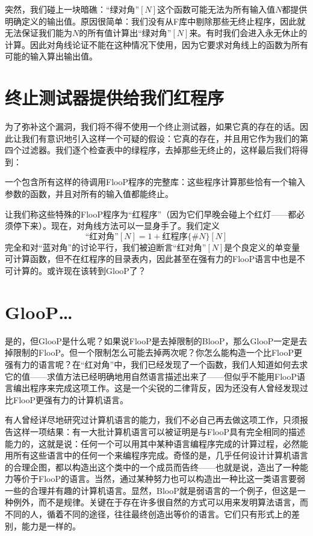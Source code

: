 突然，我们碰上一块暗礁：“绿对角”$[N]$这个函数可能无法为所有输入值$N$都提供明确定义的输出值。原因很简单：我们没有从F库中剔除那些无终止程序，因此就无法保证我们能为$N$的所有值计算出“绿对角”$[N]$来。有时我们会进入永无休止的计算。因此对角线论证不能在这种情况下使用，因为它要求对角线上的函数为所有可能的输入算出输出值。

\section{终止测试器提供给我们红程序}

为了弥补这个漏洞，我们将不得不使用一个终止测试器，如果它真的存在的话。因此让我们有意识地引入这样一个可疑的假设：它真的存在，并且用它作为我们的第四个过滤器。我们逐个检查表中的绿程序，去掉那些无终止的，这样最后我们将得到：

\begin{block}
一个包含所有这样的待调用FlooP程序的完整库：这些程序计算那些恰有一个输入参数的函数，并且对所有的输入值都能终止。
\end{block}

让我们称这些特殊的FlooP程序为“红程序”（因为它们早晚会碰上个红灯——都必须停下来）。现在，对角线方法可以一显身手了。我们定义
\[
\text{“红对角”}[N]=1+\text{红程序}\{\#N\}[N]
\]
完全和对“蓝对角”的讨论平行，我们被迫断言“红对角”$[N]$是个良定义的单变量可计算函数，但不在红程序的目录表内，因此甚至在强有力的FlooP语言中也是不可计算的。或许现在该转到GlooP了？

\section{GlooP…}

是的，但GlooP是什么呢？如果说FlooP是去掉限制的BlooP，那么GlooP一定是去掉限制的FlooP。但一个限制怎么可能去掉两次呢？你怎么能构造一个比FlooP更强有力的语言呢？在“红对角”中，我们已经发现了一个函数，我们人知道如何去求它的值——求值方法已经明确地用自然语言描述出来了——但似乎不能用FlooP语言编出程序来完成这项工作。这是一个尖锐的二律背反，因为还没有人曾经发现过比FlooP更强有力的计算机语言。

有人曾经详尽地研究过计算机语言的能力，我们不必自己再去做这项工作，只须报告这样一项结果：有一大批计算机语言可以被证明是与FlooP具有完全相同的描述能力的，这就是说：任何一个可以用其中某种语言编程序完成的计算过程，必然能用所有这些语言中的任何一个来编程序完成。奇怪的是，几乎任何设计计算机语言的合理企图，都以构造出这个类中的一个成员而告终——也就是说，造出了一种能力等价于FlooP的语言。当然，通过某种努力也可以构造出一种比这一类语言要弱一些的合理并有趣的计算机语言。显然，BlooP就是弱语言的一个例子，但这是一种例外，而不是规律。关键在于存在许多很自然的方式可以用来发明算法语言，而不同的人，循着不同的途径，往往最终创造出等价的语言。它们只有形式上的差别，能力是一样的。

